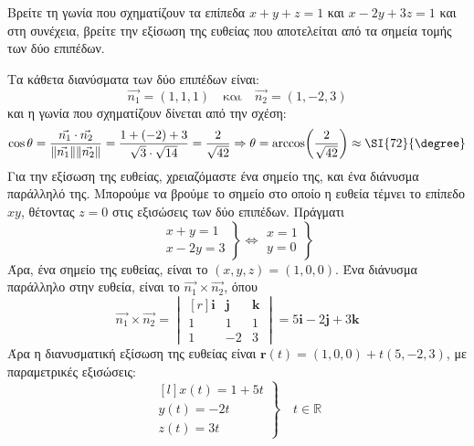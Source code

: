 \begin{example}
   Βρείτε τη γωνία που σχηματίζουν τα επίπεδα $ x+y+z=1 $ και $ x-2y+3z=1 $ και 
   στη συνέχεια, βρείτε την εξίσωση της ευθείας που αποτελείται από τα σημεία τομής 
   των δύο επιπέδων.
 \end{example}
 \begin{solution}
   Τα κάθετα διανύσματα των δύο επιπέδων είναι:
   \[
     \vec{n_{1}} = (1,1,1) \quad \text{και} \quad \vec{n_{2}} = (1,-2,3) 
   \]
    και η γωνία που σχηματίζουν δίνεται από την σχέση:
    \[
      \cos{\theta} = \frac{\vec{n_{1}} \cdot \vec{n_{2}}}{\norm{\vec{n_{1}}}
      \norm{\vec{n_{2}}}} = \frac{1+(-2)+3}{\sqrt{3}\cdot \sqrt{14}} =
      \frac{2}{\sqrt{42}} \Rightarrow \theta = \arccos(\frac{2}{\sqrt{42}}) \approx 
      \SI{72}{\degree} 
    \] 
    Για την εξίσωση της ευθείας, χρειαζόμαστε ένα σημείο της, και ένα διάνυσμα 
    παράλληλό της. Μπορούμε να βρούμε το σημείο στο οποίο η ευθεία τέμνει το επίπεδο 
    $ xy $, θέτοντας $ z=0 $ στις εξισώσεις των δύο επιπέδων. Πράγματι 
    \[
      \left.
        \begin{matrix}
          x+y=1 \\
          x-2y=3
        \end{matrix} 
      \right\} \Leftrightarrow 
      \left.
        \begin{matrix}
          x=1 \\
          y=0
        \end{matrix} 
      \right\} 
    \] 
    Άρα, ένα σημείο της ευθείας, είναι το $ (x,y,z) = (1,0,0) $.
    Ένα διάνυσμα παράλληλο στην ευθεία, είναι το $ \vec{n_{1}} \times \vec{n_{2}} $, 
    όπου
    \[
      \vec{n_{1}} \times \vec{n_{2}} = 
      \begin{vmatrix*}[r]
        \mathbf{i} & \mathbf{j} & \mathbf{k} \\
        1 & 1 & 1 \\
        1 & -2 & 3
      \end{vmatrix*} = 5 \mathbf{i}- 2 \mathbf{j}+ 3 \mathbf{k} 
    \] 
    Άρα η διανυσματική εξίσωση της ευθείας είναι 
    $ \mathbf{r}(t) = (1,0,0) + t(5,-2,3) $, με παραμετρικές εξισώσεις:
    \[
      \left.
        \begin{matrix*}[l]
          x(t) = 1+5t \\
          y(t) = -2t \\
          z(t) = 3t
        \end{matrix*} 
      \right\} \quad t \in \mathbb{R}
    \]
  \end{solution}

  
